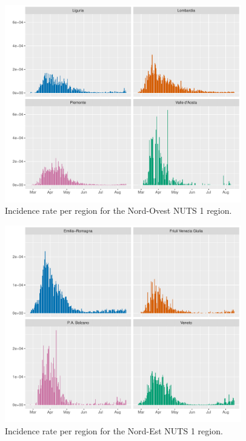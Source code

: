 \documentclass[12pt]{article}
\begin{document}
\begin{appendices}
		\begin{figure}[H]
    	    \centering
    	    \includegraphics[width=0.92\textwidth]{output/infective_rates_Nord-Ovest.pdf}
    	    \caption{Incidence rate per region for the Nord-Ovest NUTS 1 region.}
    	    \label{fig:incidence_nordovest}
    	\end{figure}
    	
    	\begin{figure}[H]
    	    \centering
    	    \includegraphics[width=0.92\textwidth]{output/infective_rates_Nord-Est.pdf}
    	    \caption{Incidence rate per region for the Nord-Est NUTS 1 region.}
    	    \label{fig:incidence_nordest}
    	\end{figure}
    	

\end{appendices}
\end{document}
